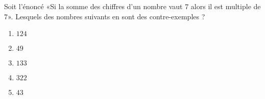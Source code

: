 
\begin{exercice}\label{exosmath-0890}

    Soit l'énoncé «Si la somme des chiffres d'un nombre vaut \( 7\) alors il est multiple de \( 7\)».  Lesquels des nombres suivants en sont des contre-exemples ?
    \begin{multicols}{2}
        \begin{enumerate}
            \item
                \( 124\)
            \item
                \( 49\)
            \item
                \( 133\)
            \item
                \( 322\)
            \item
                \( 43\)
        \end{enumerate}
    \end{multicols}


\end{exercice}

